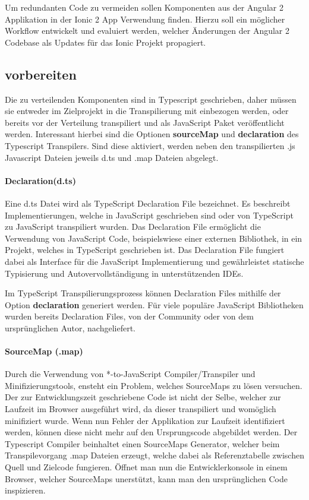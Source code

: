Um redundanten Code zu vermeiden sollen Komponenten aus der Angular 2 Applikation in der Ionic 2 App Verwendung finden.
Hierzu soll ein möglicher Workflow entwickelt und evaluiert werden, welcher Änderungen
der Angular 2 Codebase als Updates für das Ionic Projekt propagiert.

\subsection{vorbereiten}

Die zu verteilenden Komponenten sind in Typescript geschrieben,
daher müssen sie entweder im Zielprojekt in die Transpilierung mit einbezogen werden,
oder bereits vor der Verteilung transpiliert und als JavaScript Paket veröffentlicht werden.
Interessant hierbei sind die Optionen \textbf{sourceMap} und \textbf{declaration} des Typescript Transpilers.
Sind diese aktiviert, werden neben den transpilierten .js Javascript Dateien jeweils d.ts und .map Dateien abgelegt.

\paragraph{Declaration(d.ts)}

Eine d.ts Datei wird als TypeScript Declaration File bezeichnet.
Es beschreibt Implementierungen, welche in JavaScript geschrieben sind oder von TypeScript zu JavaScript transpiliert wurden.
Das Declaration File ermöglicht die Verwendung von JavaScript Code, beispielswiese einer externen Bibliothek,
in ein Projekt, welches in TypeScript geschrieben ist. Das Declaration File fungiert dabei als Interface
für die JavaScript Implementierung und gewährleistet statische Typisierung
und Autovervollständigung in unterstützenden IDEs.

Im TypeScript Transpilierungsprozess können Declaration Files mithilfe der Option \textbf{declaration} generiert werden.
Für viele populäre JavaScript Bibliotheken wurden bereits Declaration Files, von der Community oder von dem ursprünglichen Autor, nachgeliefert.
\cite[471]{EssentialTS}

\paragraph{SourceMap (.map)}

Durch die Verwendung von *-to-JavaScript Compiler/Transpiler und Minifizierungstools, ensteht ein Problem, welches SourceMaps zu lösen versuchen.
Der zur Entwicklungszeit geschriebene Code ist nicht der Selbe, welcher zur Laufzeit im Browser ausgeführt wird, da dieser transpiliert und womöglich minifiziert wurde.
Wenn nun Fehler der Applikation zur Laufzeit identifiziert werden, können diese nicht mehr auf den Ursprungscode abgebildet werden.
Der Typescript Compiler beinhaltet einen SourceMaps Generator, welcher beim Transpilevorgang .map Dateien erzeugt,
welche dabei als Referenztabelle zwischen Quell und Zielcode fungieren.
Öffnet man nun die Entwicklerkonsole in einem Browser, welcher SourceMaps unerstützt, kann man den ursprünglichen Code inspizieren.
\cite{Using97:online}


